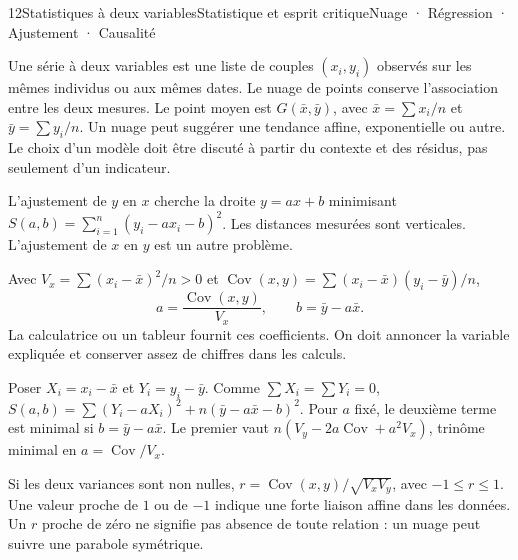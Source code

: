 \begin{ouverture}[courbe]{12}{Statistiques à deux variables}{Statistique et esprit critique}{Nuage · Régression · Ajustement · Causalité}
\end{ouverture}
\essentiel

Une série à deux variables est une liste de couples $(x_i,y_i)$ observés sur les mêmes individus ou aux mêmes dates. Le nuage de points conserve l'association entre les deux mesures.
Le point moyen est $G(\bar x,\bar y)$, avec $\bar x=\sum x_i/n$ et $\bar y=\sum y_i/n$.
Un nuage peut suggérer une tendance affine, exponentielle ou autre. Le choix d'un modèle doit être discuté à partir du contexte et des résidus, pas seulement d'un indicateur.
\begin{definition}
L'ajustement de $y$ en $x$ cherche la droite $y=ax+b$ minimisant
$S(a,b)=\sum_{i=1}^n(y_i-ax_i-b)^2$.
Les distances mesurées sont verticales. L'ajustement de $x$ en $y$ est un autre problème.
\end{definition}
Avec $V_x=\sum(x_i-\bar x)^2/n>0$ et
$\operatorname{Cov}(x,y)=\sum(x_i-\bar x)(y_i-\bar y)/n$,
\[a=\frac{\operatorname{Cov}(x,y)}{V_x},\qquad b=\bar y-a\bar x.\]
La calculatrice ou un tableur fournit ces coefficients. On doit annoncer la variable expliquée et conserver assez de chiffres dans les calculs.
\begin{demonstration}
Poser $X_i=x_i-\bar x$ et $Y_i=y_i-\bar y$. Comme $\sum X_i=\sum Y_i=0$,
$S(a,b)=\sum(Y_i-aX_i)^2+n(\bar y-a\bar x-b)^2$.
Pour $a$ fixé, le deuxième terme est minimal si $b=\bar y-a\bar x$.
Le premier vaut $n(V_y-2a\operatorname{Cov}+a^2V_x)$, trinôme minimal en $a=\operatorname{Cov}/V_x$.
\end{demonstration}
Si les deux variances sont non nulles,
$r=\operatorname{Cov}(x,y)/\sqrt{V_xV_y}$, avec $-1\leq r\leq1$.
Une valeur proche de $1$ ou de $-1$ indique une forte liaison affine dans les données. Un $r$ proche de zéro ne signifie pas absence de toute relation : un nuage peut suivre une parabole symétrique.
